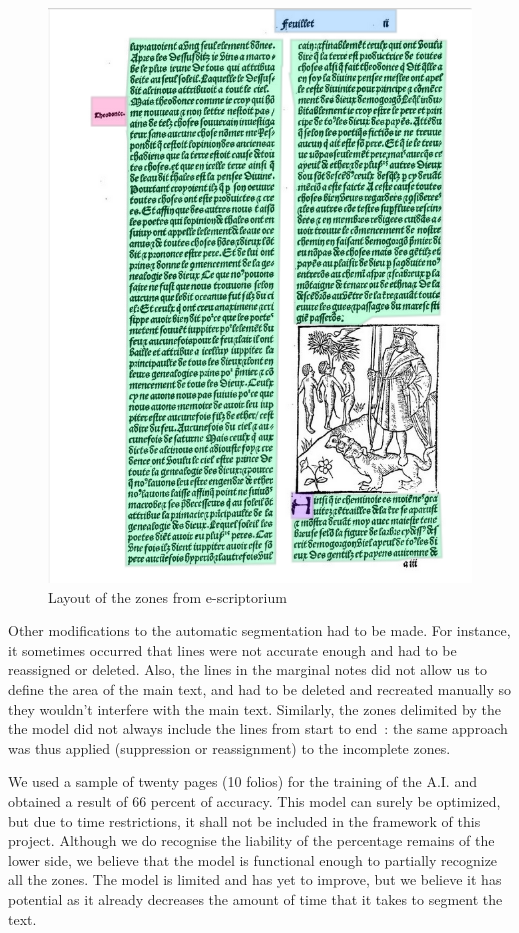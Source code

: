 \documentclass[12pt]{article}
\begin{document}
\begin{figure}[h!]
    \centering
    \includegraphics{Page escriptorium.png}
    \caption{Layout of the zones from e-scriptorium}
    \label{fig:3}
\end{figure}

Other modifications to the automatic segmentation had to be made. For instance, it sometimes occurred that lines were not accurate enough and had to be reassigned or deleted. Also, the lines in the marginal notes did not allow us to define the area of the main text, and had to be deleted and recreated manually so they wouldn't interfere with the main text. Similarly, the zones delimited by the the model did not always include the lines from start to end : the same approach was thus applied (suppression or reassignment) to the incomplete zones.


We used a sample of twenty pages (10 folios) for the training of the A.I. and obtained a result of 66 percent of accuracy. This model can surely be optimized, but due to time restrictions, it shall not be included in the framework of this project. Although we do recognise the liability of the percentage remains of the lower side, we believe that the model is functional enough to partially recognize all the zones. The model is limited and has yet to improve, but we believe it has potential as it already decreases the amount of time that it takes to segment the text.
\end{document}
